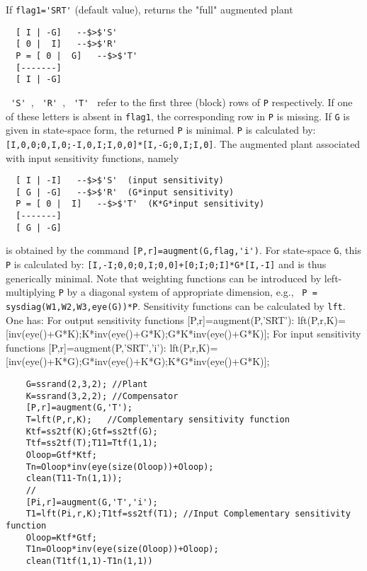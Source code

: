 \begin{mandescription}
  If \verb!flag1='SRT'! (default value), returns the "full" augmented plant
\begin{verbatim}
  [ I | -G]   --$>$'S'
  [ 0 |  I]   --$>$'R'
  P = [ 0 |  G]   --$>$'T'
  [-------]
  [ I | -G]
\end{verbatim}
\verb! 'S' !, \verb! 'R' !, \verb! 'T' ! refer to the first three (block) rows
of \verb!P! respectively.
If one of these letters is absent in \verb!flag1!, the corresponding
row in \verb!P! is missing.
If \verb!G! is given in state-space form, the returned \verb!P! is minimal.
\verb!P! is calculated by: \verb![I,0,0;0,I,0;-I,0,I;I,0,0]*[I,-G;0,I;I,0]!.
The augmented plant associated with input sensitivity functions, namely
\begin{verbatim}
  [ I | -I]   --$>$'S'  (input sensitivity)
  [ G | -G]   --$>$'R'  (G*input sensitivity)
  P = [ 0 |  I]   --$>$'T'  (K*G*input sensitivity)
  [-------]
  [ G | -G]
\end{verbatim}
is obtained by the command \verb![P,r]=augment(G,flag,'i')!. For
state-space \verb!G!, this \verb!P!
is calculated by: \verb![I,-I;0,0;0,I;0,0]+[0;I;0;I]*G*[I,-I]!
and is thus generically minimal.
Note that weighting functions can be introduced by left-multiplying
\verb!P! by a diagonal system of appropriate dimension, e.g.,
\verb! P = sysdiag(W1,W2,W3,eye(G))*P!.
Sensitivity functions can be calculated by \verb!lft!. One has:
For output sensitivity functions [P,r]=augment(P,'SRT'):
lft(P,r,K)=[inv(eye()+G*K);K*inv(eye()+G*K);G*K*inv(eye()+G*K)];
For input sensitivity functions [P,r]=augment(P,'SRT','i'):
lft(P,r,K)=[inv(eye()+K*G);G*inv(eye()+K*G);K*G*inv(eye()+G*K)];
\end{mandescription}
\begin{examples}
  \begin{Verbatim}
    G=ssrand(2,3,2); //Plant
    K=ssrand(3,2,2); //Compensator
    [P,r]=augment(G,'T');
    T=lft(P,r,K);   //Complementary sensitivity function
    Ktf=ss2tf(K);Gtf=ss2tf(G);
    Ttf=ss2tf(T);T11=Ttf(1,1);
    Oloop=Gtf*Ktf;
    Tn=Oloop*inv(eye(size(Oloop))+Oloop);
    clean(T11-Tn(1,1));
    //
    [Pi,r]=augment(G,'T','i');
    T1=lft(Pi,r,K);T1tf=ss2tf(T1); //Input Complementary sensitivity function
    Oloop=Ktf*Gtf;
    T1n=Oloop*inv(eye(size(Oloop))+Oloop);
    clean(T1tf(1,1)-T1n(1,1))
  \end{Verbatim}
\end{examples}
\begin{manseealso}
     
\end{manseealso}
